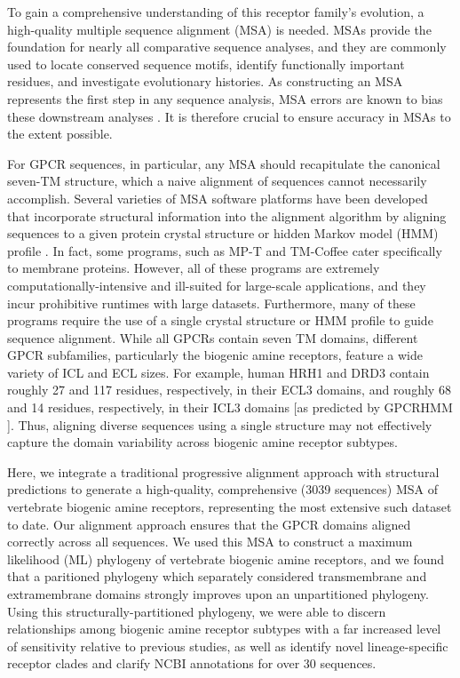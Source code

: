 \documentclass[fleqn,10pt]{wlpeerj}
\begin{document}
To gain a comprehensive understanding of this receptor family's evolution, a high-quality multiple sequence alignment (MSA) is needed. MSAs provide the foundation for nearly all comparative sequence analyses, and they are commonly used to locate conserved sequence motifs, identify functionally important residues, and investigate evolutionary histories. As constructing an MSA represents the first step in any sequence analysis, MSA errors are known to bias these downstream analyses \citep{Ogden2006, Wong2008, Jordan2012}. It is therefore crucial to ensure accuracy in MSAs to the extent possible. 

For GPCR sequences, in particular, any MSA should recapitulate the canonical seven-TM structure, which a naive alignment of sequences cannot necessarily accomplish. Several varieties of MSA software platforms have been developed that incorporate structural information into the alignment algorithm by aligning sequences to a given protein crystal structure \citep{promals3d, 3dcoffee} or hidden Markov model (HMM) profile \citep{hmmer, Chang2012, Hill2012}. In fact, some programs, such as MP-T \citep{Hill2012} and TM-Coffee \citep{Chang2012} cater specifically to membrane proteins. However, all of these programs are extremely computationally-intensive and ill-suited for large-scale applications, and they incur prohibitive runtimes with large datasets. Furthermore, many of these programs require the use of a single crystal structure or HMM profile to guide sequence alignment. While all GPCRs contain seven TM domains, different GPCR subfamilies, particularly the biogenic amine receptors, feature a wide variety of ICL and ECL sizes. For example, human HRH1 and DRD3 contain roughly 27 and 117 residues, respectively, in their ECL3 domains, and roughly 68 and 14 residues, respectively, in their ICL3 domains [as predicted by GPCRHMM \citep{Wistrand2006}]. Thus, aligning diverse sequences using a single structure may not effectively capture the domain variability across biogenic amine receptor subtypes. 

Here, we integrate a traditional progressive alignment approach with structural predictions to generate a high-quality, comprehensive (3039 sequences) MSA of vertebrate biogenic amine receptors, representing the most extensive such dataset to date. Our alignment approach ensures that the GPCR domains aligned correctly across all sequences. We used this MSA to construct a maximum likelihood (ML) phylogeny of vertebrate biogenic amine receptors, and we found that a paritioned phylogeny which separately considered transmembrane and extramembrane domains strongly improves upon an unpartitioned phylogeny. Using this structurally-partitioned phylogeny, we were able to discern relationships among biogenic amine receptor subtypes with a far increased level of sensitivity relative to previous studies, as well as identify novel lineage-specific receptor clades and clarify NCBI annotations for over 30 sequences.
\end{document}
